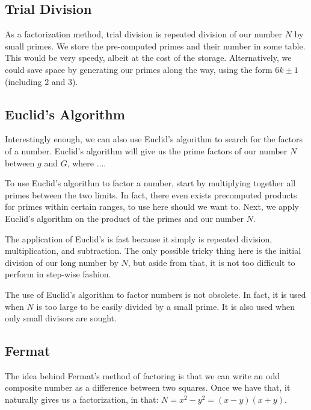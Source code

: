 \documentclass{article}
\begin{document}
\subsection{ Trial Division }
\par As a factorization method, trial division is repeated division of our number $N$ by
small primes. We store the pre-computed primes and their number in some table. This would be very
speedy, albeit at the cost of the storage. Alternatively, we could save space by generating our 
primes along the way, using the form $6k \pm 1$ (including $2$ and $3$).

\subsection{ Euclid's Algorithm }
\par Interestingly enough, we can also use Euclid's algorithm to search for the factors of a
number. Euclid's algorithm will give us the prime factors of our number $N$ between $g$ and $G$, where
....

\par To use Euclid's algorithm to factor a number, start by multiplying together all primes between
the two limits. In fact, there even exists precomputed products for primes within certain ranges, to
use here should we want to. Next, we apply Euclid's algorithm on the product of the primes and our number
$N$.

\par The application of Euclid's is fast because it simply is repeated division, multiplication, and
subtraction. The only possible tricky thing here is the initial division of our long number by $N$, but
aside from that, it is not too difficult to perform in step-wise fashion.

\par The use of Euclid's algorithm to factor numbers is not obsolete. In fact, it is used when $N$ is
too large to be easily divided by a small prime. It is also used when only small divisors are sought.


\subsection{ Fermat }
\par The idea behind Fermat's method of factoring is that we can write an odd composite number as a difference
between two squares. Once we have that, it naturally gives us a factorization, in that: $N = x^2 - y^2 = (x-y)(x+y)$.
\end{document}
